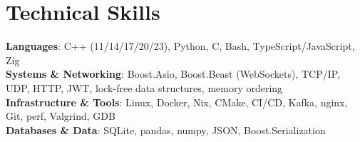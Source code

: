 \section{Technical Skills}
 \begin{itemize}[leftmargin=0.15in, label={}]
    \small{\item{
     \textbf{Languages}{: C++ (11/14/17/20/23), Python, C, Bash, TypeScript/JavaScript, Zig} \\
     \textbf{Systems \& Networking}{: Boost.Asio, Boost.Beast (WebSockets), TCP/IP, UDP, HTTP, JWT, lock-free data structures, memory ordering} \\
     \textbf{Infrastructure \& Tools}{: Linux, Docker, Nix, CMake, CI/CD, Kafka, nginx, Git, perf, Valgrind, GDB} \\
     \textbf{Databases \& Data}{: SQLite, pandas, numpy, JSON, Boost.Serialization}
    }}
 \end{itemize}
